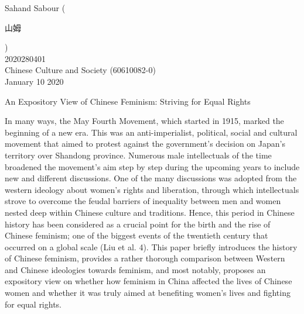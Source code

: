 \documentclass[12pt]{article}
\begin{document}
	\begin{flushleft}
		
		Sahand Sabour (\begin{CJK*}{UTF8}{gbsn}
			山姆
		\end{CJK*} )\\
		2020280401\\
		Chinese Culture and Society (60610082-0)\\
		January 10 2020\\
		
		
		\begin{center}
			An Expository View of Chinese Feminism: Striving for Equal Rights
		\end{center}
		
		
		\setlength{\parindent}{0.5in}
		\justifying
		In many ways, the May Fourth Movement, which started in 1915, marked the beginning of a new era. This was an anti-imperialist, political, social and cultural movement that aimed to protest against the government’s decision on Japan’s territory over Shandong province. Numerous male intellectuals of the time broadened the movement’s aim step by step during the upcoming years to include new and different discussions. One of the many discussions was adopted from the western ideology about women’s rights and liberation, through which intellectuals strove to overcome the feudal barriers of inequality between men and women nested deep within Chinese culture and traditions. Hence, this period in Chinese history has been considered as a crucial point for the birth and the rise of Chinese feminism; one of the biggest events of the twentieth century that occurred on a global scale (Liu et al. 4). This paper briefly introduces the history of Chinese feminism, provides a rather thorough comparison between Western and Chinese ideologies towards feminism, and most notably, proposes an expository view on whether how feminism in China affected the lives of Chinese women and whether it was truly aimed at benefiting women’s lives and fighting for equal rights.
		

\end{flushleft}
\end{document}
